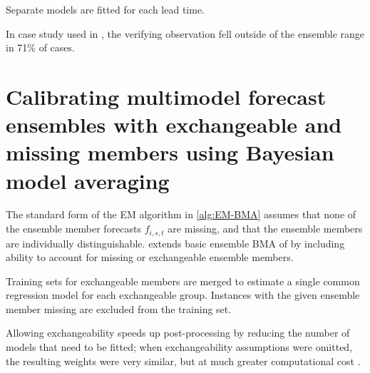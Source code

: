 \documentclass[10pt,fleqn]{article}
\begin{document}
\vspace{12pt}

Separate models are fitted for each lead time.

In case study used in \cite{Raftery2005}, the verifying observation fell outside of the ensemble range in 71\% of cases.









\section{Calibrating multimodel forecast ensembles with exchangeable and missing members using Bayesian model averaging \cite{Fraley2010}}

The standard form of the EM algorithm in \autoref{alg:EM-BMA} assumes that none of the ensemble member forecasts $f_{i,s,t}$ are missing, and that the ensemble members are individually distinguishable. \cite{Fraley2010} extends basic ensemble BMA of \cite{Raftery2005} by including ability to account for missing or exchangeable ensemble members. 

Training sets for exchangeable members are merged to estimate a single common regression model for each exchangeable group. Instances with the given ensemble member missing are excluded from the training set.

Allowing exchangeability speeds up post-processing by reducing the number of models that need to be fitted; when exchangeability assumptions were omitted, the resulting weights were very similar, but at much greater computational cost \cite[\textit{\S 3c}]{Fraley2010}.
\end{document}
